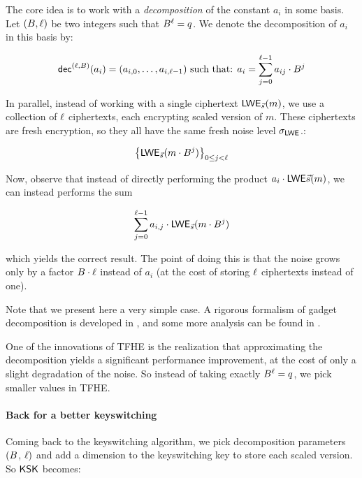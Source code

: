 The core idea is to work with a \textit{decomposition} of the constant $a_i$ in some basis. Let $(B, \ell)$ be two integers such that $B^\ell = q$. We denote the decomposition of $a_i$ in this basis by:

\[
	\textsf{dec}^{(\ell, B)}(a_i) = (a_{i,0}, \dots, a_{i, \ell-1}) \text{ such that: } a_i = \sum_{j=0}^{\ell-1} a_{ij} \cdot B^j
\]

In parallel, instead of working with a single ciphertext $\textsf{LWE}_{\vec s}(m)$, we use a collection of $\ell$ ciphertexts, each encrypting scaled version of $m$. These ciphertexts are fresh encryption, so they all have the same fresh noise level $\sigma_{\textsf{LWE}}$.: 

\[
	\left \lbrace \textsf{LWE}_{\vec s}(m \cdot B^j) \right \rbrace_{0 \le j < \ell}
\]

Now, observe that instead of directly performing the product $a_i \cdot \textsf{LWE}{\vec s}(m)$, we can instead performs the sum 

\[
	\sum_{j=0}^{\ell - 1} a_{i,j} \cdot \textsf{LWE}_{\vec s}(m \cdot B^j)
\]

which yields the correct result. The point of doing this is that the noise grows only by a factor $B \cdot \ell$ instead of $a_i$ (at the cost of storing $\ell$ ciphertexts instead of one).

Note that we present here a very simple case. A rigorous formalism of gadget decomposition is developed in \cite{EC:GenMicPol19}, and some more analysis can be found in \cite{AC:Joye21}.


One of the innovations of TFHE is the realization that approximating the decomposition yields a significant performance improvement, at the cost of only a slight degradation of the noise. So instead of taking exactly $B^\ell = q$, we pick smaller values in TFHE.


\paragraph{Back for a better keyswitching}

Coming back to the keyswitching algorithm, we pick decomposition parameters $(B$, $\ell)$ and add a dimension to the keyswitching key to store each scaled version. So $\textsf{KSK}$ becomes:

